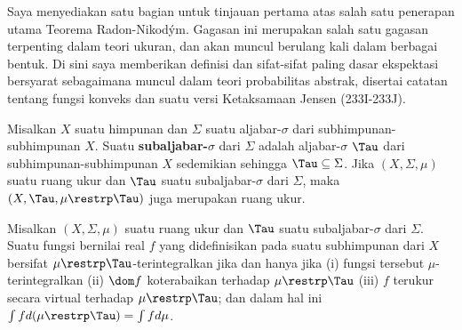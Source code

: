 
\def\chaptername{Teorema Radon-Nikod\'ym}
\def\sectionname{Ekspektasi bersyarat}


Saya menyediakan satu bagian untuk tinjauan pertama atas salah satu
penerapan utama Teorema Radon-Nikod\'ym. Gagasan ini merupakan salah satu
gagasan terpenting dalam teori ukuran, dan akan muncul berulang kali dalam
berbagai bentuk. Di sini saya memberikan definisi dan sifat-sifat paling
dasar ekspektasi bersyarat sebagaimana muncul dalam teori probabilitas
abstrak, disertai catatan tentang fungsi konveks dan suatu versi
Ketaksamaan Jensen (233I-233J).

 Misalkan $X$ suatu himpunan dan $\Sigma$
suatu aljabar-$\sigma$ dari subhimpunan-subhimpunan $X$. Suatu
{\bf subaljabar-$\sigma$} dari $\Sigma$ adalah aljabar-$\sigma$ $\Tau$
dari subhimpunan-subhimpunan $X$ sedemikian sehingga
$\Tau\subseteq\Sigma$. Jika $(X,\Sigma,\mu)$ suatu ruang ukur dan
$\Tau$ suatu subaljabar-$\sigma$ dari $\Sigma$, maka
$(X,\Tau,\mu\restrp\Tau)$ juga merupakan ruang ukur.

 Misalkan $(X,\Sigma,\mu)$ suatu ruang ukur dan $\Tau$
suatu subaljabar-$\sigma$ dari $\Sigma$. Suatu fungsi bernilai real $f$
yang didefinisikan pada suatu subhimpunan dari $X$
bersifat $\mu\restrp\Tau$-terintegralkan jika dan hanya jika (i) fungsi
tersebut $\mu$-terintegralkan (ii) $\dom f$ koterabaikan terhadap
$\mu\restrp\Tau$ (iii) $f$ terukur secara virtual terhadap
$\mu\restrp\Tau$; dan dalam hal ini
$\int fd(\mu\restrp\Tau)=\int fd\mu$.

